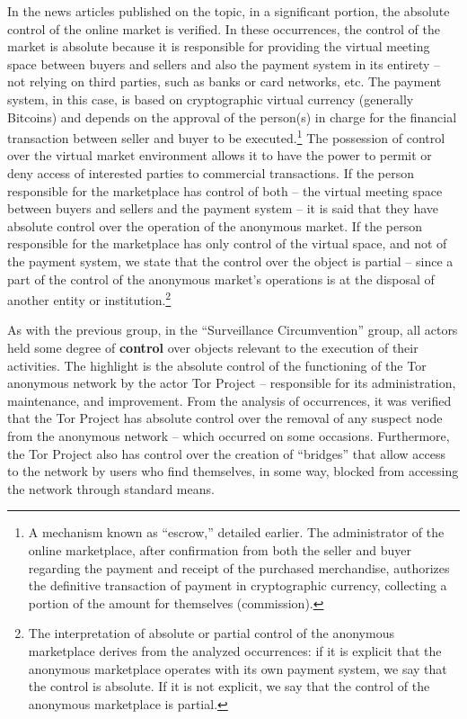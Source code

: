 In the news articles published on the topic, in a significant portion, the absolute control of the online market is verified. In these occurrences, the control of the market is absolute because it is responsible for providing the virtual meeting space between buyers and sellers and also the payment system in its entirety -- not relying on third parties, such as banks or card networks, etc. The payment system, in this case, is based on cryptographic virtual currency (generally Bitcoins) and depends on the approval of the person(s) in charge for the financial transaction between seller and buyer to be executed.\footnote{A mechanism known as ``escrow,'' detailed earlier. The administrator of the online marketplace, after confirmation from both the seller and buyer regarding the payment and receipt of the purchased merchandise, authorizes the definitive transaction of payment in cryptographic currency, collecting a portion of the amount for themselves (commission).} The possession of control over the virtual market environment allows it to have the power to permit or deny access of interested parties to commercial transactions. If the person responsible for the marketplace has control of both -- the virtual meeting space between buyers and sellers and the payment system -- it is said that they have absolute control over the operation of the anonymous market. If the person responsible for the marketplace has only control of the virtual space, and not of the payment system, we state that the control over the object is partial -- since a part of the control of the anonymous market's operations is at the disposal of another entity or institution.\footnote{The interpretation of absolute or partial control of the anonymous marketplace derives from the analyzed occurrences: if it is explicit that the anonymous marketplace operates with its own payment system, we say that the control is absolute. If it is not explicit, we say that the control of the anonymous marketplace is partial.}

As with the previous group, in the ``Surveillance Circumvention'' group, all actors held some degree of \textbf{control} over objects relevant to the execution of their activities. The highlight is the absolute control of the functioning of the Tor anonymous network by the actor Tor Project -- responsible for its administration, maintenance, and improvement. From the analysis of occurrences, it was verified that the Tor Project has absolute control over the removal of any suspect node from the anonymous network -- which occurred on some occasions. Furthermore, the Tor Project also has control over the creation of ``bridges'' that allow access to the network by users who find themselves, in some way, blocked from accessing the network through standard means.

